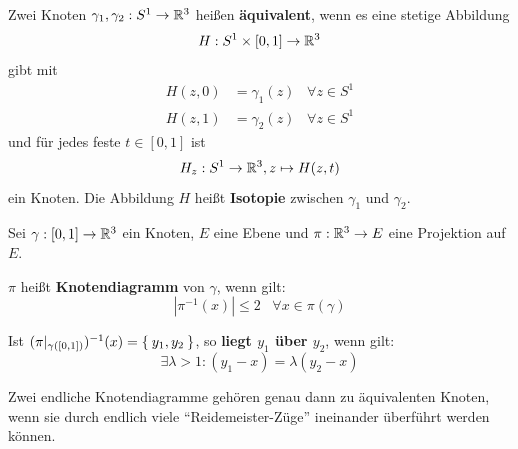 \begin{definition}\label{def:Isotopie}%
    Zwei Knoten $\gamma_1, \gamma_2: S^1 \rightarrow \mathbb{R}^3$ heißen
    \textbf{äquivalent}, wenn es eine stetige Abbildung
    \[H: S^1 \times [0,1] \rightarrow \mathbb{R}^3\]
    gibt mit 
    \begin{align*}
        H(z,0) &= \gamma_1(z) \;\;\;\forall z \in S^1\\
        H(z,1) &= \gamma_2(z) \;\;\;\forall z \in S^1
    \end{align*}
    und für jedes
    feste $t \in [0,1]$ ist 
    \[H_z: S^1 \rightarrow \mathbb{R}^3, z \mapsto H(z,t)\]
    ein Knoten. Die Abbildung $H$ heißt \textbf{Isotopie} zwischen
    $\gamma_1$ und $\gamma_2$.
\end{definition}

\begin{definition}%
    Sei $\gamma: [0,1] \rightarrow \mathbb{R}^3$ ein Knoten, $E$ eine Ebene und 
    $\pi: \mathbb{R}^3 \rightarrow E$ eine Projektion auf $E$.

    $\pi$ heißt \textbf{Knotendiagramm} von $\gamma$, wenn gilt:
    \[\left | \pi^{-1}(x) \right | \leq 2 \;\;\; \forall x \in \pi(\gamma)\]

    Ist $(\pi|_{\gamma([0,1])})^{-1}(x) = \Set{y_1, y_2}$, so \textbf{liegt $y_1$ über $y_2$},
    wenn gilt:
    \[\exists \lambda > 1: (y_1-x) = \lambda (y_2 - x)\]
\end{definition}

\begin{satz}
    Zwei endliche Knotendiagramme gehören genau dann zu äquivalenten
    Knoten, wenn sie durch endlich viele \enquote{Reidemeister-Züge}
    ineinander überführt werden können.
\end{satz}

